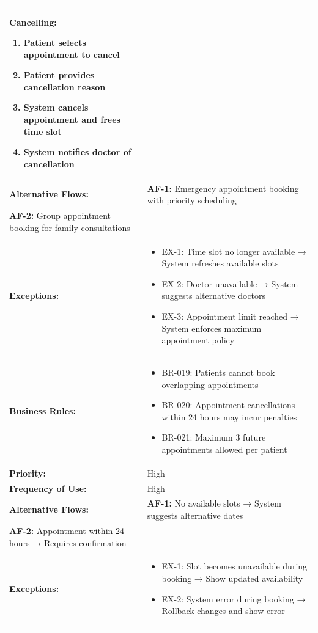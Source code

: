 \documentclass[12pt,a4paper]{article}
\begin{document}
\begin{longtable}{|p{4.5cm}|p{10.5cm}|}
\begin{enumerate}
\end{enumerate}
\textbf{Cancelling:}
\begin{enumerate}
  \item Patient selects appointment to cancel
  \item Patient provides cancellation reason
  \item System cancels appointment and frees time slot
  \item System notifies doctor of cancellation
\end{enumerate} \\
\hline
\textbf{Alternative Flows:} &
\textbf{AF-1:} Emergency appointment booking with priority scheduling \\
\textbf{AF-2:} Group appointment booking for family consultations \\
\hline
\textbf{Exceptions:} &
\begin{itemize}
  \item EX-1: Time slot no longer available → System refreshes available slots
  \item EX-2: Doctor unavailable → System suggests alternative doctors
  \item EX-3: Appointment limit reached → System enforces maximum appointment policy
\end{itemize} \\
\hline
\textbf{Business Rules:} &
\begin{itemize}
  \item BR-019: Patients cannot book overlapping appointments
  \item BR-020: Appointment cancellations within 24 hours may incur penalties
  \item BR-021: Maximum 3 future appointments allowed per patient
\end{itemize} \\
\hline
\textbf{Priority:} & High \\
\hline
\textbf{Frequency of Use:} & High \\
\hline
\hline
\textbf{Alternative Flows:} &
\textbf{AF-1:} No available slots → System suggests alternative dates \\
\textbf{AF-2:} Appointment within 24 hours → Requires confirmation \\
\hline
\textbf{Exceptions:} &
\begin{itemize}
  \item EX-1: Slot becomes unavailable during booking → Show updated availability
  \item EX-2: System error during booking → Rollback changes and show error

\end{itemize}
\end{longtable}
\end{document}
